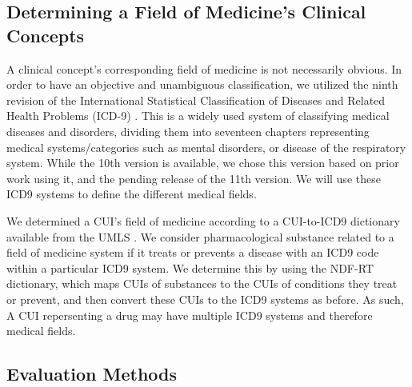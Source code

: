 \documentclass[11pt,a4paper]{article}
\begin{document}
\subsection{Determining a Field of Medicine's Clinical Concepts}
A clinical concept's corresponding field of medicine is not necessarily obvious. In order to have an objective and unambiguous classification, we utilized the ninth revision of the International Statistical Classification of Diseases and Related Health Problems (ICD-9) \cite{sleeInternationalClassificationDiseases1978}. This is a widely used system of classifying medical diseases and disorders, dividing them into seventeen chapters representing medical systems/categories such as mental disorders, or disease of the respiratory system. While the 10th version is available, we chose this version based on prior work using it, and the pending release of the 11th version. We will use these ICD9 systems to define the different medical fields. 

We determined a CUI's field of medicine according to a CUI-to-ICD9 dictionary available from the UMLS \cite{bodenreiderUnifiedMedicalLanguage2004}. We consider pharmacological substance related to a field of medicine system if it treats or prevents a disease with an ICD9 code within a particular ICD9 system. We determine this by using the NDF-RT dictionary, which maps CUIs of substances to the CUIs of conditions they treat or prevent, and then convert these CUIs to the ICD9 systems as before.  As such, A CUI repersenting a drug may have multiple ICD9 systems and therefore medical fields. 

\subsection{Evaluation Methods}
\end{document}
